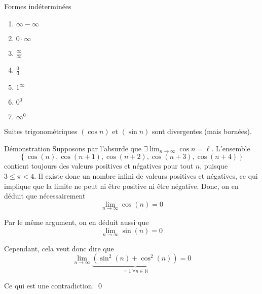 \documentclass[a4paper]{article}
\begin{document}
\begin{parag}{Formes indéterminées}
    \begin{enumerate}[left=0pt]
        \item $\infty - \infty$
        \item $0\cdot \infty$
        \item $\frac{\infty}{\infty}$
        \item $\frac{0}{0}$
        \item $1^{\infty}$
        \item $0^{0}$
        \item $\infty^{0}$
    \end{enumerate}
    
\end{parag}

\begin{parag}{Suites trigonométriques}
    $\left(\cos n\right)$ et $\left(\sin n\right)$ sont divergentes (mais bornées).

    \begin{subparag}{Démonstration}
    Supposons par l'absurde que $\exists \lim_{n \to \infty} \cos n = \ell$. L'ensemble 
    \[\left\{\cos\left(n\right), \cos\left(n+1\right), \cos\left(n+2\right), \cos\left(n+3\right), \cos\left(n+4\right)\right\}\]
    contient toujours des valeurs positives et négatives pour tout $n$, puisque $3 \leq \pi < 4$. Il existe donc un nombre infini de valeurs positives et négatives, ce qui implique que la limite ne peut ni être positive ni être négative. Donc, on en déduit que nécessairement 
    \[\lim_{n \to \infty} \cos\left(n\right) = 0\]

    Par le même argument, on en déduit aussi que 
    \[\lim_{n \to \infty} \sin\left(n\right) = 0\]
    
    Cependant, cela veut donc dire que 
    \[\lim_{n \to \infty} \underbrace{\left(\sin^2\left(n\right) + \cos^2\left(n\right)\right)}_{= 1 \ \forall n \in \mathbb{N}} = 0\]
    
    Ce qui est une contradiction.
    \qed
    \end{subparag}
\end{parag}
\end{document}
